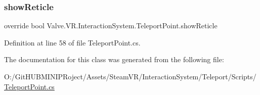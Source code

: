 \subsubsection{\texorpdfstring{showReticle}{showReticle}}
{\footnotesize\ttfamily override bool Valve.\+V\+R.\+Interaction\+System.\+Teleport\+Point.\+show\+Reticle\hspace{0.3cm}{\ttfamily [get]}}



Definition at line 58 of file Teleport\+Point.\+cs.



The documentation for this class was generated from the following file\+:\begin{DoxyCompactItemize}
\item 
O\+:/\+Git\+H\+U\+B\+M\+I\+N\+I\+P\+Roject/\+Assets/\+Steam\+V\+R/\+Interaction\+System/\+Teleport/\+Scripts/\mbox{\hyperlink{_teleport_point_8cs}{Teleport\+Point.\+cs}}\end{DoxyCompactItemize}
